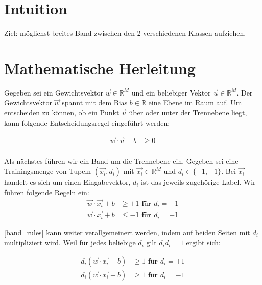 \documentclass[a4paper,11pt,twoside]{scrreprt}
\begin{document}
\section{Intuition}
Ziel: möglichst breites Band zwischen den 2 verschiedenen Klassen aufziehen.

\section{Mathematische Herleitung}
Gegeben sei ein Gewichtsvektor $\vec{w} \in \mathbb{R}^{M}$ und ein beliebiger Vektor $\vec{u} \in \mathbb{R}^{M}$. Der Gewichtsvektor $\vec{w}$ spannt mit dem Bias $b \in \mathbb{R}$ eine Ebene im Raum auf. Um entscheiden zu können, ob ein Punkt $\vec{u}$ über oder unter der Trennebene liegt, kann folgende Entscheidungsregel eingeführt werden:

\begin{equation} \label{dec_rule}
    \begin{aligned}
    \vec{w} \cdot \vec{u} + b & \geq 0 \\
    \end{aligned}
\end{equation}

Als nächstes führen wir ein Band um die Trennebene ein. Gegeben sei eine Trainingsmenge von Tupeln $(\vec{x_{i}}, d_{i})$ mit $\vec{x_{i}} \in \mathbb{R}^{M}$ und $d_{i} \in \{-1, +1\}$. Bei $\vec{x_{i}}$ handelt es sich um einen Eingabevektor, $d_{i}$ ist das jeweils zugehörige Label. Wir führen folgende Regeln ein:
\begin{equation} \label{band_rules}
    \begin{aligned}
    \vec{w} \cdot \vec{x_{i}} + b & \geq +1 \textbf{ für $d_{i} = +1$} \\
    \vec{w} \cdot \vec{x_{i}} + b & \leq -1 \textbf{ für $d_{i} = -1$}
    \end{aligned}
\end{equation}

\autoref{band_rules} kann weiter verallgemeinert werden, indem auf beiden Seiten mit $d_{i}$ multipliziert wird. Weil für jedes beliebige $d_{i}$ gilt $d_{i} d_{i} = 1$ ergibt sich:

\begin{equation} \label{band_rule}
    \begin{aligned}
    d_{i} (\vec{w} \cdot \vec{x_{i}} + b) & \geq 1 \textbf{ für $d_{i} = +1$}\\
    d_{i} (\vec{w} \cdot \vec{x_{i}} + b) & \geq 1 \textbf{ für $d_{i} = -1$}\\
    \end{aligned}
\end{equation}
\end{document}
